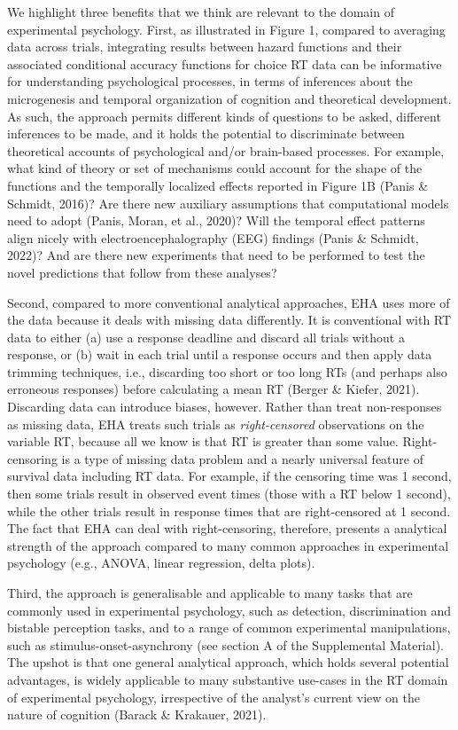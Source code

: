 \documentclass[
  man, donotrepeattitle,floatsintext]{apa6}
\begin{document}
We highlight three benefits that we think are relevant to the domain of experimental psychology.
First, as illustrated in Figure 1, compared to averaging data across trials, integrating results between hazard functions and their associated conditional accuracy functions for choice RT data can be informative for understanding psychological processes, in terms of inferences about the microgenesis and temporal organization of cognition and theoretical development.
As such, the approach permits different kinds of questions to be asked, different inferences to be made, and it holds the potential to discriminate between theoretical accounts of psychological and/or brain-based processes.
For example, what kind of theory or set of mechanisms could account for the shape of the functions and the temporally localized effects reported in Figure 1B (Panis \& Schmidt, 2016)?
Are there new auxiliary assumptions that computational models need to adopt (Panis, Moran, et al., 2020)?
Will the temporal effect patterns align nicely with electroencephalography (EEG) findings (Panis \& Schmidt, 2022)?
And are there new experiments that need to be performed to test the novel predictions that follow from these analyses?

Second, compared to more conventional analytical approaches, EHA uses more of the data because it deals with missing data differently.
It is conventional with RT data to either (a) use a response deadline and discard all trials without a response, or (b) wait in each trial until a response occurs and then apply data trimming techniques, i.e., discarding too short or too long RTs (and perhaps also erroneous responses) before calculating a mean RT (Berger \& Kiefer, 2021).
Discarding data can introduce biases, however.
Rather than treat non-responses as missing data, EHA treats such trials as \emph{right-censored} observations on the variable RT, because all we know is that RT is greater than some value.
Right-censoring is a type of missing data problem and a nearly universal feature of survival data including RT data.
For example, if the censoring time was 1 second, then some trials result in observed event times (those with a RT below 1 second), while the other trials result in response times that are right-censored at 1 second.
The fact that EHA can deal with right-censoring, therefore, presents a analytical strength of the approach compared to many common approaches in experimental psychology (e.g., ANOVA, linear regression, delta plots).

Third, the approach is generalisable and applicable to many tasks that are commonly used in experimental psychology, such as detection, discrimination and bistable perception tasks, and to a range of common experimental manipulations, such as stimulus-onset-asynchrony (see section A of the Supplemental Material).
The upshot is that one general analytical approach, which holds several potential advantages, is widely applicable to many substantive use-cases in the RT domain of experimental psychology, irrespective of the analyst's current view on the nature of cognition (Barack \& Krakauer, 2021).
\end{document}
